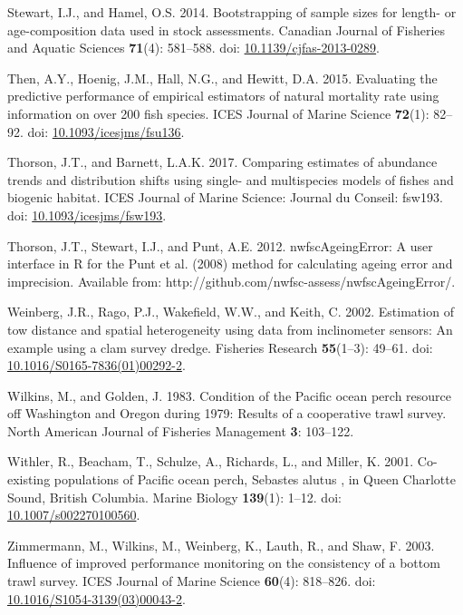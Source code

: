 \documentclass[12pt,]{article}
\begin{document}
\hypertarget{ref-stewart_bootstrapping_2014}{}
Stewart, I.J., and Hamel, O.S. 2014. Bootstrapping of sample sizes for
length- or age-composition data used in stock assessments. Canadian
Journal of Fisheries and Aquatic Sciences \textbf{71}(4): 581--588. doi:
\href{https://doi.org/10.1139/cjfas-2013-0289}{10.1139/cjfas-2013-0289}.

\hypertarget{ref-then_evaluating_2015}{}
Then, A.Y., Hoenig, J.M., Hall, N.G., and Hewitt, D.A. 2015. Evaluating
the predictive performance of empirical estimators of natural mortality
rate using information on over 200 fish species. ICES Journal of Marine
Science \textbf{72}(1): 82--92. doi:
\href{https://doi.org/10.1093/icesjms/fsu136}{10.1093/icesjms/fsu136}.

\hypertarget{ref-thorson_comparing_2017}{}
Thorson, J.T., and Barnett, L.A.K. 2017. Comparing estimates of
abundance trends and distribution shifts using single- and multispecies
models of fishes and biogenic habitat. ICES Journal of Marine Science:
Journal du Conseil: fsw193. doi:
\href{https://doi.org/10.1093/icesjms/fsw193}{10.1093/icesjms/fsw193}.

\hypertarget{ref-thorson_nwfscageingerror:_2012}{}
Thorson, J.T., Stewart, I.J., and Punt, A.E. 2012. nwfscAgeingError: A
user interface in R for the Punt et al. (2008) method for calculating
ageing error and imprecision. Available from:
http://github.com/nwfsc-assess/nwfscAgeingError/.

\hypertarget{ref-weinberg_estimation_2002}{}
Weinberg, J.R., Rago, P.J., Wakefield, W.W., and Keith, C. 2002.
Estimation of tow distance and spatial heterogeneity using data from
inclinometer sensors: An example using a clam survey dredge. Fisheries
Research \textbf{55}(1--3): 49--61. doi:
\href{https://doi.org/10.1016/S0165-7836(01)00292-2}{10.1016/S0165-7836(01)00292-2}.

\hypertarget{ref-wilkins_condition_1983}{}
Wilkins, M., and Golden, J. 1983. Condition of the Pacific ocean perch
resource off Washington and Oregon during 1979: Results of a cooperative
trawl survey. North American Journal of Fisheries Management \textbf{3}:
103--122.

\hypertarget{ref-withler_co-existing_2001}{}
Withler, R., Beacham, T., Schulze, A., Richards, L., and Miller, K.
2001. Co-existing populations of Pacific ocean perch, Sebastes alutus ,
in Queen Charlotte Sound, British Columbia. Marine Biology
\textbf{139}(1): 1--12. doi:
\href{https://doi.org/10.1007/s002270100560}{10.1007/s002270100560}.

\hypertarget{ref-zimmermann_influence_2003}{}
Zimmermann, M., Wilkins, M., Weinberg, K., Lauth, R., and Shaw, F. 2003.
Influence of improved performance monitoring on the consistency of a
bottom trawl survey. ICES Journal of Marine Science \textbf{60}(4):
818--826. doi:
\href{https://doi.org/10.1016/S1054-3139(03)00043-2}{10.1016/S1054-3139(03)00043-2}.
\end{document}
